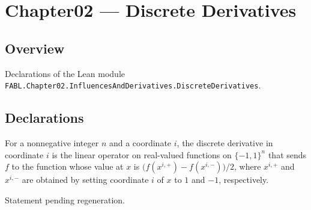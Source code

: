 \chapter{Chapter02 — Discrete Derivatives}
\section{Overview}

Declarations of the Lean module \texttt{FABL.Chapter02.InfluencesAndDerivatives.DiscreteDerivatives}.

\section{Declarations}

\begin{definition}
\label{FABL.discreteDerivative}
\leanok
{}
For a nonnegative integer $n$ and a coordinate $i$, the discrete derivative in
coordinate $i$ is the linear operator on real-valued functions on $\{-1,1\}^n$ that
sends $f$ to the function whose value at $x$ is $\bigl(f(x^{i,+})-f(x^{i,-})\bigr)/2$,
where $x^{i,+}$ and $x^{i,-}$ are obtained by setting coordinate $i$ of $x$ to $1$ and
$-1$, respectively.
\end{definition}

\begin{theorem}
\label{FABL.discreteDerivative_apply}
\leanok
{}
Statement pending regeneration.
\end{theorem}


